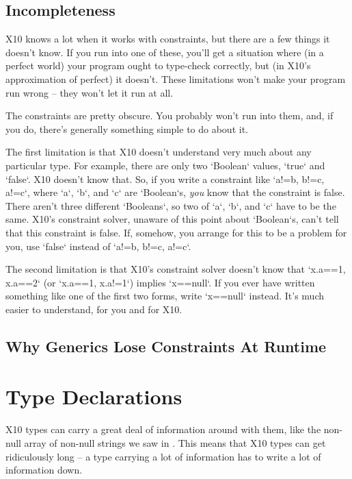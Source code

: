 \subsection{Incompleteness}

X10 knows a lot when it works with constraints, but there are a few things it
doesn't know.  If you run into one of these, you'll get a situation where (in
a perfect world) your program ought to type-check correctly, but (in X10's
approximation of perfect)  it doesn't.  These limitations won't make your
program run wrong -- they won't let it run at all.

The constraints are pretty obscure.  You probably won't run into them, and, if
you do, there's generally something simple to do about it.

The first limitation is that X10 doesn't understand very much about any
particular type.  For example, there are only two \xcd`Boolean` values,
\xcd`true` and \xcd`false`.  X10 doesn't know that.  So, if you write a
constraint like \xcd`{a!=b, b!=c, a!=c}`, where \xcd`a`, \xcd`b`, and \xcd`c`
are \xcd`Boolean`s, {\em you} know that the constraint is false.  There aren't
three different \xcd`Booleans`, so two of \xcd`a`, \xcd`b`, and \xcd`c` have
to be the same.  X10's constraint solver, unaware of this point about
\xcd`Boolean`s, can't tell that this constraint is false. 
If, somehow, you arrange for this to be a problem for you, use \xcd`false`
instead of 
\xcd`{a!=b, b!=c, a!=c}`.

The second limitation is that X10's constraint solver doesn't know that
\xcd`{x.a==1, x.a==2}` (or \xcd`{x.a==1, x.a!=1}`) implies \xcd`x==null`.
If you ever have written something like one of the first two forms, write
\xcd`x==null` instead.  It's much easier to understand, for you and for X10.


\subsection{Why Generics Lose Constraints At Runtime}



\section{Type Declarations}
\label{sect:TypeDecl}

X10 types can carry a great deal of information around with them, like the
non-null array of non-null strings we saw in .
This means that X10 types can get ridiculously long -- a type carrying a lot
of information has to write a lot of information down.  

